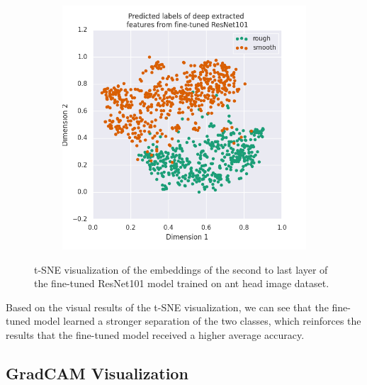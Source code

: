 \documentclass{aci}
\numberwithin{equation}{section}
\begin{document}
\begin{figure}[h]
\begin{subfigure}{.45\textwidth}
        \includegraphics[width=1\linewidth]{thesis_assets/plots/fresnet101_pred_tsne.png}
    \end{subfigure}
    \caption{t-SNE visualization of the embeddings of the second to last layer
        of the fine-tuned ResNet101 model trained on ant head image dataset.}
    \label{fig:fresnet101_tsne}
\end{figure}

Based on the visual results of the t-SNE visualization, we can see that the
fine-tuned model learned a stronger separation of the two classes, which
reinforces the results that the fine-tuned model received a higher average
accuracy.

\subsection{GradCAM Visualization}
\end{document}
